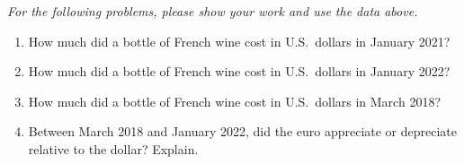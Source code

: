 \documentclass[
    letterpaper,paper=portrait,fleqn,
    DIV=16,fontsize=12pt,twoside=semi,
    parskip=full-,
    headings=standardclasses]
{scrartcl}
\begin{document}
\vfill

\clearpage

\emph{For the following problems, please show your work and use the data above.}

\begin{enumerate}

\item How much did a bottle of French wine cost in U.S.~dollars in January 2021?

\vfill

\item How much did a bottle of French wine cost in U.S.~dollars in January 2022?

\vfill

\item How much did a bottle of French wine cost in U.S.~dollars in March 2018?

\vfill

\item Between March 2018 and January 2022, did the euro appreciate or depreciate relative to the dollar? Explain.

\vfill

\end{enumerate}
\end{document}
